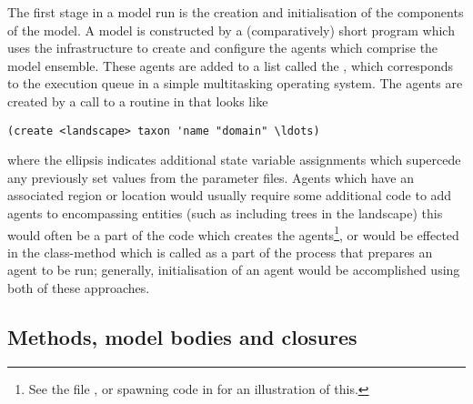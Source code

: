 The first stage in a model run is the creation and initialisation of the
components of the model. A model is constructed by a (comparatively)
short \Scheme program which uses the infrastructure to create
and configure the agents which comprise the model ensemble.  These
agents are added to a list called the , which
corresponds to the execution queue in a simple multitasking operating
system. The agents are created by a call to a routine in
 that looks like
\begin{verbatim}
(create <landscape> taxon 'name "domain" \ldots)
\end{verbatim}
where the ellipsis indicates additional state variable
assignments which supercede any previously set values from the
parameter files. Agents which have an associated region or location
would usually require some additional code to add agents to
encompassing entities (such as including trees in the landscape) this
would often be a part of the code which creates the
agents\footnote{See the file , or spawning
code in  for an illustration of this.},
or would be effected in the class-method 
which is called as a part of the process that prepares an agent to be
run; generally, initialisation of an agent would be accomplished using
both of these approaches.


\subsection{Methods, model bodies and closures}

